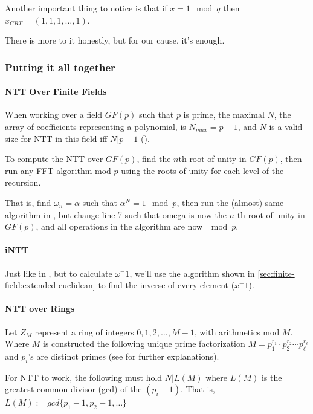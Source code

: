 Another important thing to notice is that if  $x=1 \mod q$
 then $x_{CRT}= (1,1,1,\dots,1)$.


There is more to it honestly, but for our cause, it's enough.

\subsubsection{Putting it all together}

\paragraph[NTT Over Finite Fields]{ NTT Over Finite Fields} \label{ntt-field}
When working over a field $GF(p)$ such that $p$ is prime,
the maximal $N$, the array of coefficients representing a
polynomial, is $N_{max}=p-1$, and $N$ is a valid size for NTT
 in this field iff $N|p-1$ (\cite[III. number theoretic transforms]{ntt}). 


To compute the NTT over $GF(p)$, find the $n$th root of unity in $GF(p)$,
 then run any FFT algorithm mod $p$ using the roots
of unity for each level of the recursion.

That is, find $\omega_n=\alpha$ such that $\alpha^N=1 \mod p$, 
then run the (almost) same algorithm in , 
but change line 7 such that omega is now the $n$-th root of unity in $GF(p)$, and
all operations in the algorithm are now $\mod p$.

\paragraph{iNTT}
Just like in , but to calculate $\omega^-1$, we'll
use the algorithm shown in \autoref{sec:finite-field:extended-euclidean} 
to find the inverse of every element ($x^-1$).



\paragraph[short]{NTT over Rings}
Let $Z_M$ represent a ring of integers ${0,1,2,\dots , M-1}$,
with arithmetics mod $M$.
Where $M$ is constructed the following unique prime factorization
$M=p_{1}^{r_1}\cdot  p_{2}^{r_2} \cdots p_{\ell}^{r_\ell}$
and $p_i$'s are distinct primes (see \cite[NTT sec. III][]{ntt}
 for further explanations).

For NTT to work, the following must hold $N|L(M)$
where $L(M)$ is the greatest common
divisor (gcd) of the $(p_{i}-1)$. That is, 
$L(M):= gcd\{p_1-1,p_2-1,\dots\}$

